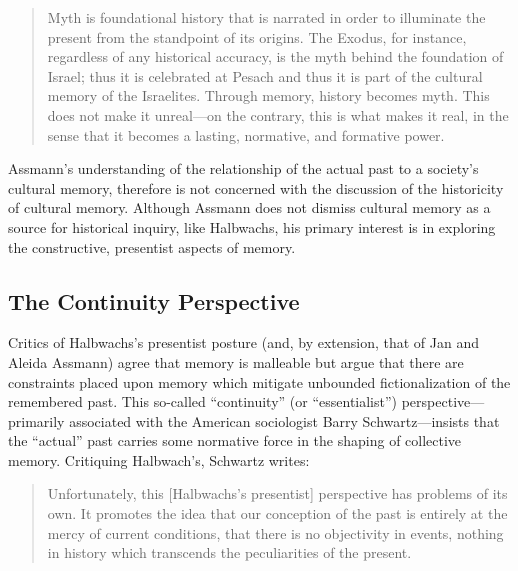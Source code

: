 \begin{quote}
Myth is foundational history that is narrated in order to illuminate the
present from the standpoint of its origins. The Exodus, for instance,
regardless of any historical accuracy, is the myth behind the foundation
of Israel; thus it is celebrated at Pesach and thus it is part of the
cultural memory of the Israelites. Through memory, history becomes myth.
This does not make it unreal---on the contrary, this is what makes it
real, in the sense that it becomes a lasting, normative, and formative
power.\autocite[38]{assmann2011}
\end{quote}

Assmann's understanding of the relationship of the actual past to a
society's cultural memory, therefore is not concerned with the
discussion of the historicity of cultural memory. Although Assmann does
not dismiss cultural memory as a source for historical inquiry, like
Halbwachs, his primary interest is in exploring the constructive,
presentist aspects of memory.

\hypertarget{the-continuity-perspective}{%
\subsection{The Continuity
Perspective}\label{the-continuity-perspective}}

Critics of Halbwachs's presentist posture (and, by extension, that of
Jan and Aleida Assmann) agree that memory is malleable but argue that
there are constraints placed upon memory which mitigate unbounded
fictionalization of the remembered past. This so-called ``continuity''
(or ``essentialist'') perspective---primarily associated with the
American sociologist Barry Schwartz---insists that the ``actual'' past
carries some normative force in the shaping of collective
memory.\autocites[Schwartz has made numerous contributions to the field
of memory studies. See
esp.][]{schwartz_sf1982}{schwartz_asr1991}[and][]{schwartz2000}[Note
also the SBL volume specifically interacting with his
work:][]{thatcher2014} Critiquing Halbwach's, Schwartz writes:

\begin{quote}
Unfortunately, this {[}Halbwachs's presentist{]} perspective has
problems of its own. It promotes the idea that our conception of the
past is entirely at the mercy of current conditions, that there is no
objectivity in events, nothing in history which transcends the
peculiarities of the present.\autocite[376]{schwartz_sf1982}
\end{quote}

